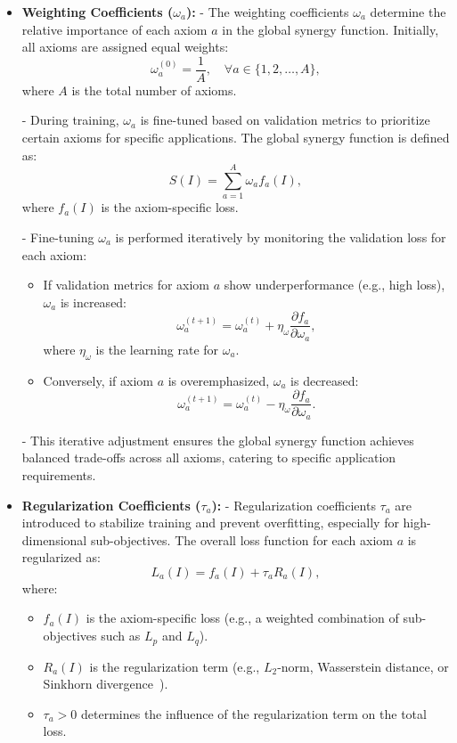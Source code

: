\begin{itemize}
\item \textbf{Weighting Coefficients (\(\omega_a\)):}  
    - The weighting coefficients \(\omega_a\) determine the relative importance of each axiom \(a\) in the global synergy function. Initially, all axioms are assigned equal weights:
    \[
    \omega_a^{(0)} = \frac{1}{A}, \quad \forall a \in \{1, 2, \dots, A\},
    \]
    where \(A\) is the total number of axioms.  

    - During training, \(\omega_a\) is fine-tuned based on validation metrics to prioritize certain axioms for specific applications. The global synergy function is defined as:
    \[
    S(I) = \sum_{a=1}^A \omega_a f_a(I),
    \]
    where \(f_a(I)\) is the axiom-specific loss.  

    - Fine-tuning \(\omega_a\) is performed iteratively by monitoring the validation loss for each axiom:
        \begin{itemize}
            \item If validation metrics for axiom \(a\) show underperformance (e.g., high loss), \(\omega_a\) is increased:
            \[
            \omega_a^{(t+1)} = \omega_a^{(t)} + \eta_\omega \frac{\partial f_a}{\partial \omega_a},
            \]
            where \(\eta_\omega\) is the learning rate for \(\omega_a\).  
            \item Conversely, if axiom \(a\) is overemphasized, \(\omega_a\) is decreased:
            \[
            \omega_a^{(t+1)} = \omega_a^{(t)} - \eta_\omega \frac{\partial f_a}{\partial \omega_a}.
            \]
        \end{itemize}

    - This iterative adjustment ensures the global synergy function achieves balanced trade-offs across all axioms, catering to specific application requirements.


\item \textbf{Regularization Coefficients (\(\tau_a\)):}  
    - Regularization coefficients \(\tau_a\) are introduced to stabilize training and prevent overfitting, especially for high-dimensional sub-objectives. The overall loss function for each axiom \(a\) is regularized as:
    \[
    L_a(I) = f_a(I) + \tau_a R_a(I),
    \]
    where:
    \begin{itemize}
        \item \(f_a(I)\) is the axiom-specific loss (e.g., a weighted combination of sub-objectives such as \(L_p\) and \(L_q\)).
        \item \(R_a(I)\) is the regularization term (e.g., \(L_2\)-norm, Wasserstein distance, or Sinkhorn divergence~\cite{cuturi2013sinkhorn}).  
        \item \(\tau_a > 0\) determines the influence of the regularization term on the total loss.  
    \end{itemize}


\end{itemize}
